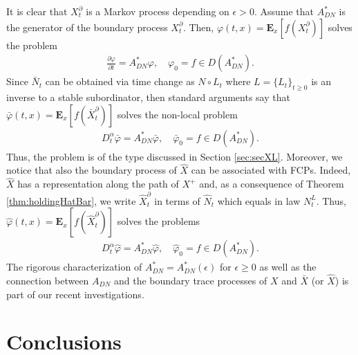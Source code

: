 \documentclass[11pt,a4paper]{article}
\begin{document}
It is clear that $X^\partial_t$ is a Markov process depending on $\epsilon>0$. Assume that $A^*_{DN}$ is the generator of the boundary process $X^\partial_t$. Then, $\varphi(t,x) = \mathbf{E}_x[f(X^\partial_t)]$ solves the problem
\begin{align*}
\frac{\partial \varphi}{\partial t} = A^*_{DN} \varphi, \quad \varphi_0 = f \in D(A^*_{DN}).
\end{align*}
Since $\bar{N}_t$ can be obtained via time change as $N \circ L_t$ where $L=\{L_t\}_{t\geq 0}$ is an inverse to a stable subordinator, then standard arguments say that $\bar{\varphi}(t,x) = \mathbf{E}_x[f(\bar{X}^\partial_t)]$ solves the non-local problem
\begin{align*}
D^\alpha_t \bar{\varphi} = A^*_{DN} \bar{\varphi}, \quad \bar{\varphi}_0 = f \in D(A^*_{DN}).
\end{align*}
Thus, the problem is of the type discussed in Section \ref{sec:secXL}.  Moreover, we notice that also the boundary process of $\hat{X}$ can be associated with  FCPs. Indeed, $\hat{X}$ has a representation along the path of $X^+$ and, as a consequence of Theorem \ref{thm:holdingHatBar}, we write $\hat{X}^\partial_t$ in terms of $\hat{N}_t$ which equals in law $N^L_t$. Thus, $\hat{\varphi}(t,x) = \mathbf{E}_x[f(\hat{X}^\partial_t)]$ solves the problems 
\begin{align*}
D^\alpha_t \hat{\varphi} = A^*_{DN} \hat{\varphi}, \quad \hat{\varphi}_0 = f \in D(A^*_{DN}).
\end{align*}
The rigorous characterization of $A^*_{DN}=A^*_{DN}(\epsilon)$ for $\epsilon \geq 0$ as well as the connection between $A_{DN}$ and the boundary trace processes of $X$ and $\bar{X}$ (or $\hat{X}$) is part of our recent investigations. 







\section{Conclusions}
\label{Sec:ConOP}

\end{document}
